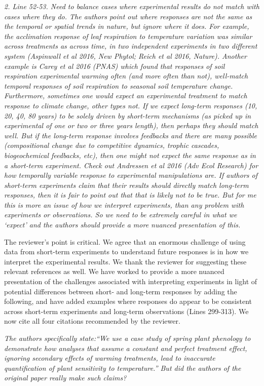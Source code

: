 \documentclass[11pt,a4paper]{letter}
\begin{document}
\par \emph{2. Line 52-53. Need to balance cases where experimental results do not match with cases where they do. The authors point out where responses are not the same as the temporal or spatial trends in nature, but ignore where it does. For example, the acclimation response of leaf respiration to temperature variation was similar across treatments as across time, in two independent experiments in two different system (Aspinwall et al 2016, New Phytol; Reich et al 2016, Nature). Another example is Carey et al 2016 (PNAS) which found that responses of soil respiration experimental warming often (and more often than not), well-match temporal responses of soil respiration to seasonal soil temperature change. Furthermore, sometimes one would expect an experimental treatment to match response to climate change, other types not. If we expect long-term responses (10, 20, 40, 80 years) to be solely driven by short-term mechanisms (as picked up in experimental of one or two or three years length), then perhaps they should match well. But if the long-term response involves feedbacks and there are many possible (compositional change due to competitive dynamics, trophic cascades, biogeochemical feedbacks, etc), then one might not expect the same response as in a short-term experiment. Check out Andressen et al 2016 (Adv Ecol Research) for how temporally variable response to experimental manipulations are. If authors of short-term
experiments claim that their results should directly match long-term responses, then it is fair to point out that that is likely not to be true. But for me this is more an issue of how we interpret experiments, than any problem with experiments or observations. So we need to be extremely careful in what we `expect' and the authors should provide a more nuanced presentation of this.}

\par The reviewer's point is critical. We agree that an enormous challenge of using data from short-term experiments to understand future responses is in how we interpret the experimental results. We thank the reviewer for suggesting these relevant references as well. We have worked to provide a more nuanced presentation of the challenges associated with interpreting experiments in light of potential differences between short- and long-term responses by adding the following, and have added examples where responses do appear to be consistent across short-term experiments and long-term observations (Lines 299-313). We now cite all four citations recommended by the reviewer. 
\\
\par \emph{The authors specifically state:``We use a case study of spring plant phenology to demonstrate how analyses that assume a constant and perfect treatment effect, ignoring secondary effects of warming treatments, lead to inaccurate quantification of plant sensitivity to temperature.'' But did the authors of the original paper really make such claims?}
\end{document}

